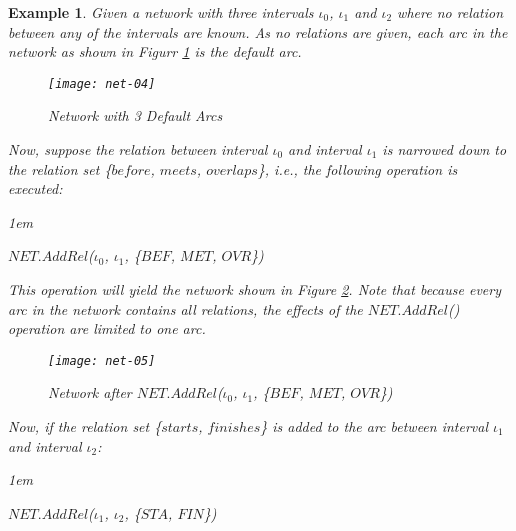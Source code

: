 \documentclass[11pt]{report}
\newtheorem{vexample}{Example}[chapter]
\newenvironment{vquote}
{
  \begin{list}{}{\leftmargin 1em}\item[]
}
{
  \end{list}
}
\begin{document}
          \begin{vexample}
            \label{exam-tempo-expl1}
            Given a network with three intervals $\iota_0$, $\iota_1$ and
            $\iota_2$ where no relation between any of the intervals are known.
            As no relations are given, each arc in the network as shown in
            Figurr \ref{figu-tempo-ntwk4} is the default arc.

            \begin{figure}[tbhp]
              \begin{center}
                \texttt{[image: net-04]}
                \caption{Network with 3 Default Arcs}
                \label{figu-tempo-ntwk4}
              \end{center}
            \end{figure}

            \noindent
            Now, suppose the relation between interval $\iota_0$ and interval
            $\iota_1$ is narrowed down to the relation set \{$before$, $meets$,
            $overlaps$\}, i.e., the following operation is executed:

            \begin{vquote}
              $NET.AddRel$($\iota_0$, $\iota_1$, \{$BEF$, $MET$, $OVR$\})
            \end{vquote}

            \noindent
            This operation will yield the network shown in Figure
            \ref{figu-tempo-ntwk5}. Note that because every arc in the network
            contains all relations, the effects of the $NET.AddRel$() operation
            are limited to one arc.

            \begin{figure}[tbhp]
              \begin{center}
                \texttt{[image: net-05]}
                \caption{Network after $NET.AddRel$($\iota_0$, $\iota_1$, \{$BEF$, $MET$, $OVR$\})}
                \label{figu-tempo-ntwk5}
              \end{center}
            \end{figure}

            \noindent
            Now, if the relation set \{$starts$, $finishes$\} is added to the
            arc between interval $\iota_1$ and interval $\iota_2$:

            \begin{vquote}
              $NET.AddRel$($\iota_1$, $\iota_2$, \{$STA$, $FIN$\})
            \end{vquote}


\end{vexample}
\end{document}
